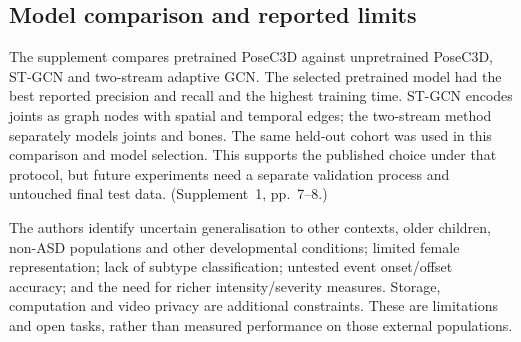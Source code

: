 \subsection{Model comparison and reported limits}
The supplement compares pretrained PoseC3D against unpretrained PoseC3D, ST-GCN and two-stream adaptive GCN. The selected pretrained model had the best reported precision and recall and the highest training time. ST-GCN encodes joints as graph nodes with spatial and temporal edges; the two-stream method separately models joints and bones. The same held-out cohort was used in this comparison and model selection. This supports the published choice under that protocol, but future experiments need a separate validation process and untouched final test data. (Supplement~1, pp.~7--8.)

The authors identify uncertain generalisation to other contexts, older children, non-ASD populations and other developmental conditions; limited female representation; lack of subtype classification; untested event onset/offset accuracy; and the need for richer intensity/severity measures. Storage, computation and video privacy are additional constraints. These are limitations and open tasks, rather than measured performance on those external populations. \cite[p.~9]{barami2024}

